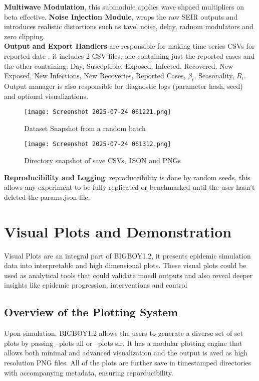 \documentclass[11pt,a4paper]{article}
\theoremstyle{remark}\newtheorem{remark}{Remark}
\begin{document}
\textbf{Multiwave Modulation}, this submodule applies wave shpaed multipliers on beta effective. \textbf{Noise Injection Module}, wraps the raw SEIR outputs and introduces realistic distortions such as tavel noise, delay, radnom modulators and zero clipping.\\
\textbf{Output and Export Handlers} are responsible for making time series CSVs for reported date , it includes 2 CSV files, one containing just the reported cases and the other containing: Day, Susceptible, Exposed, Infected, Recovered, New Exposed, New Infections, New Recoveries, Reported Cases,	$\beta_t$, Seasonality, $R_t$. Output manager is also responsible for diagnostic logs (parameter hash, seed) and optional visualizations.
\begin{figure}[H] 
    \centering
    \texttt{[image: Screenshot 2025-07-24 061221.png]} 
    \caption{Dataset Snapshot from a random batch}
    \label{fig:my_figure}
\end{figure}
\begin{figure}[H] 
    \centering
    \texttt{[image: Screenshot 2025-07-24 061312.png]} 
    \caption{Directory snapshot of save CSVs, JSON and PNGs}
    \label{fig:my_figure}
\end{figure}
\textbf{Reproducibility and Logging}: reproduceibility is done by random seeds, this allows any experiment to be fully replicated or benchmarked until the user hasn't deleted the params.json file.
\section{Visual Plots and Demonstration}
Visual Plots are an integral part of BIGBOY1.2, it presents epidemic simulation data into interpretable and high dimensional plots. These visual plots could be used as analytical tools that could validate moedl outputs and also reveal deeper insights like epidemic progression, interventions and control
\subsection{Overview of the Plotting System}
Upon simulation, BIGBOY1.2 allows the users to generate a diverse set of set plots by passing --plots all or --plots sir. It has a modular plotting engine that allows both minimal and advanced visualization and the output is aved as high resolution PNG files. All of the plots are further save in timestamped directories with accompanying metadata, ensuring reporducibility.
\end{document}
